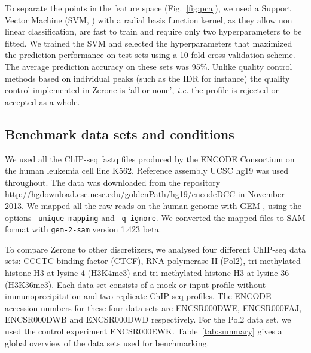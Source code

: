 \documentclass{bioinfo}
\begin{document}
\begin{methods}
To separate the points in the feature space (Fig.~\ref{fig:pca}),
we used a Support Vector Machine (SVM, \citealp{Chang2011,e1071})
with a radial basis function kernel,
as they allow non linear classification, are fast to train and
require only two hyperparameters to be fitted.
We trained the SVM and
selected the hyperparameters that maximized the prediction
performance on test sets using a 10-fold cross-validation scheme.
The average prediction accuracy on these sets was 95\%. Unlike
quality control methods based on individual peaks (such as the
IDR for instance) the quality control implemented in Zerone is
`all-or-none', \textit{i.e.} the profile is rejected or accepted
as a whole.

\subsection{Benchmark data sets and conditions}
\label{sub:bench_cond}
We used all the ChIP-seq fastq files produced by the ENCODE Consortium
on the human leukemia cell line K562. Reference assembly UCSC hg19 was
used throughout. The data was downloaded from the repository
\href{http://hgdownload.cse.ucsc.edu/goldenPath/hg19/encodeDCC}{http://hgdownload.cse.ucsc.edu/goldenPath/hg19/encodeDCC} in November 2013.
We mapped all the raw reads on the human genome with
GEM \citep[\texttt{gem-mapper} version 1.376 beta, \texttt{gem-indexer} version
1.423 beta,][]{pmid23103880}, using the options \texttt{--unique-mapping} and
\texttt{-q ignore}. We converted the mapped files to SAM format with
\texttt{gem-2-sam} version 1.423 beta.

To compare Zerone to other discretizers, we analysed four different
ChIP-seq data sets: CCCTC-binding factor (CTCF), RNA polymerase II
(Pol2), tri-methylated histone H3 at lysine 4 (H3K4me3)
and tri-methylated histone H3 at lysine 36 (H3K36me3).
Each data set consists of a mock or input profile without
immunoprecipitation and two replicate ChIP-seq profiles.
The ENCODE accession numbers for these four data sets are
ENCSR000DWE, ENCSR000FAJ, ENCSR000DWB and ENCSR000DWD respectively.
For the Pol2 data set, we used the control experiment ENCSR000EWK.
Table~\ref{tab:summary} gives a global overview of the data sets
used for benchmarking.


\end{methods}
\end{document}
